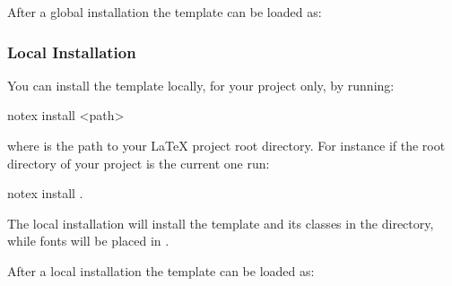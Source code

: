 \documentclass[../main.tex]{subfiles}
\begin{document}
After a global installation the template can be loaded as:



\subsubsection{Local Installation}

You can install the template locally, for your project only, by running:

\begin{bash}
    notex install <path>
\end{bash}

where  is the path to your LaTeX project root directory. For instance if the root directory of your project is the current one run:

\begin{bash}
    notex install .
\end{bash}

The local installation will install the template and its classes in the  directory, while fonts will be placed in .

After a local installation the template can be loaded as:

\end{document}
